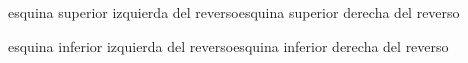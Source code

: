 \documentclass[
sindenominacion,
sinlineahni,
divisa,
monedaceldas,
sinmonedatotales,
siniva,
]{factura}
\begin{document}
\begin{factura}
\end{factura}


\begin{reverso}
esquina superior izquierda del reverso\hfill esquina superior derecha del reverso\par
\vfill
esquina inferior izquierda del reverso\hfill esquina inferior derecha del reverso
\end{reverso}

\Ejemplo
\end{document}
